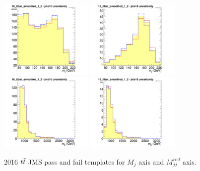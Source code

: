\begin{figure}[!htb]
	\centering
	\includegraphics[width=0.4\textwidth]{Figures/Uncertainty_16_ttbar_smoothed_1_2_jms16failX.png}
	\includegraphics[width=0.4\textwidth]{Figures/Uncertainty_16_ttbar_smoothed_1_2_jms16passX.png}
	\includegraphics[width=0.4\textwidth]{Figures/Uncertainty_16_ttbar_smoothed_1_2_jms16failY.png}
	\includegraphics[width=0.4\textwidth]{Figures/Uncertainty_16_ttbar_smoothed_1_2_jms16passY.png}
	\caption{2016 $t\bar{t} $ JMS pass and fail templates for $M_j$ axis and $M_{jj}^{red}$ axis.}
	\label{fig:jesttbarAppend}
\end{figure}
\clearpage
